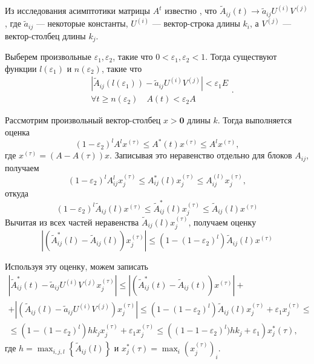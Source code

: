 \documentclass[12pt]{article}
\renewcommand{\leq}{\leqslant}
\renewcommand{\geq}{\geqslant}
\renewcommand{\epsilon}{\varepsilon}
\begin{document}
{Из исследования асимптотики матрицы $A^t$ известно \cite{zhiltsova-about-matrix}, что $\tilde{A}_{ij}(t) \rightarrow \tilde{a}_{ij} U^{(i)} V^{(j)}$, где $\tilde{a}_{ij}$ --- некоторые константы, $U^{(i)}$ --- вектор-строка длины $k_i$, а $V^{(j)}$ --- вектор-столбец длины $k_j$.

Выберем произвольные $\epsilon_1, \epsilon_2$, такие что $0 < \epsilon_1, \epsilon_2 < 1$. Тогда существуют функции $l(\epsilon_1)$ и $n(\epsilon_2)$, такие что
\begin{equation}
	\begin{split}
		&\left| \tilde{A}_{ij}(l(\epsilon_1)) - \tilde{a}_{ij} U^{(i)} V^{(j)} \right| < \epsilon_1 E \\
		&\forall t \geq n(\epsilon_2)\quad A(t) < \epsilon_2 A
	\end{split}.
\end{equation}

Рассмотрим произвольный вектор-столбец $x > \mathbf{0}$ длины $k$. Тогда выполняется оценка
\begin{equation}
	(1 - \epsilon_2)^l A^l x^{(\tau)} \leq A^*(t) x^{(\tau)} \leq A^l x^{(\tau)},
\end{equation}
где $x^{(\tau)} = (A - A(\tau)) x$. Записывая это неравенство отдельно для блоков $A_{ij}$, получаем
\begin{equation}
	(1 - \epsilon_2)^l A_{ij}^l x^{(\tau)}_j \leq A^*_{ij}(l) x^{(\tau)}_j \leq A^{(l)}_{ij} x^{(\tau)}_j,
\end{equation}
откуда
\begin{equation}
	(1 - \epsilon_2)^l \tilde{A}_{ij}(l) x^{(\tau)} \leq \tilde{A}^*_{ij}(l) x^{(\tau)}_j \leq \tilde{A}_{ij}(l) x^{(\tau)}
\end{equation}
Вычитая из всех частей неравенства $\tilde{A}_{ij}(l) x^{(\tau)}_j$, получаем оценку
\begin{equation}
	\left| \left( \tilde{A}^*_{ij}(l) - \tilde{A}_{ij}(l) \right) x^{(\tau)}_j \right| \leq (1 - (1 - \epsilon_2)^l) \tilde{A}_{ij}(l) x^{(\tau)}
\end{equation}

Используя эту оценку, можем записать
\begin{multline}
	\left| \tilde{A}^*_{ij}(t) - \tilde{a}_{ij} U^{(i)} V^{(j)} x^{(\tau)}_j \right| \leq \left| \left( \tilde{A}^*_{ij}(t) - \tilde{A}_{ij}(t) \right) x^{(\tau)} \right| + \\
	+ \left| \left( \tilde{A}_{ij}(l) - \tilde{a}_{ij} U^{(i)} V^{(j)} \right) x^{(\tau)}_j \right| \leq (1 - (1 - \epsilon_2)^l) \tilde{A}_{ij}(l) x^{(\tau)}_j + \epsilon_1 x^{(\tau)}_j \leq \\
	\leq (1 - (1 - \epsilon_2)^l) h k_j x^{(\tau)}_j + \epsilon_1 x^{(\tau)}_j \leq \left( (1 - 1 - \epsilon_2)^l) h k_j + \epsilon_1 \right) x^*_j(\tau),
\end{multline}
где $h = \max_{i,j,l} \left\{ \tilde{A}_{ij}(l) \right\}$ и $x^*_j(\tau) = \max_i (x^{(\tau)}_j)_i$.

}
\end{document}
